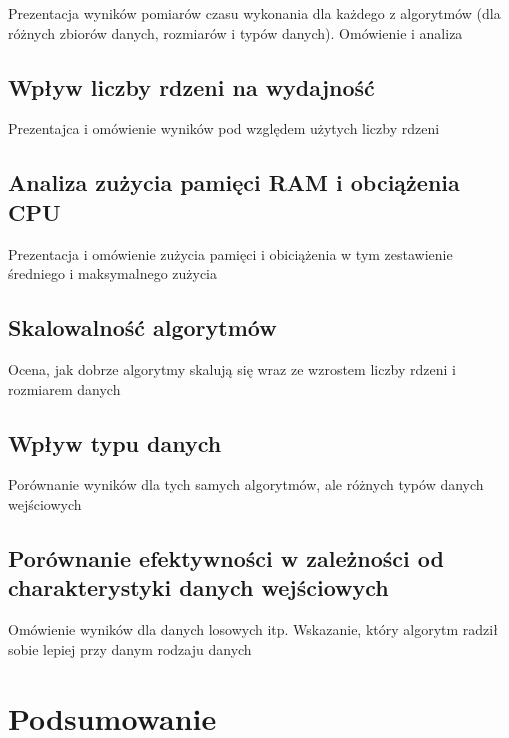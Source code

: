 \documentclass{PracaDyplomowa-Szablon}
\begin{document}
Prezentacja wyników pomiarów czasu wykonania dla każdego z algorytmów (dla różnych zbiorów danych, rozmiarów i typów danych). Omówienie i analiza

\section{Wpływ liczby rdzeni na wydajność}
\label{sec:LiczbaRdzeni}

Prezentajca i omówienie wyników pod względem użytych liczby rdzeni

\section{Analiza zużycia pamięci RAM i obciążenia CPU}
\label{sec:RamCpu}

Prezentacja i omówienie zużycia pamięci i obiciążenia w tym zestawienie średniego i maksymalnego zużycia 

\section{Skalowalność algorytmów}
\label{sec:SkalowalnoscAlgorytmow}

Ocena, jak dobrze algorytmy skalują się wraz ze wzrostem liczby rdzeni i rozmiarem danych

\section{Wpływ typu danych}
\label{sec:IntFloat}

Porównanie wyników dla tych samych algorytmów, ale różnych typów danych wejściowych

\section{Porównanie efektywności w zależności od charakterystyki danych wejściowych}
\label{sec:EfektywnoscDaneWejsciowe}

Omówienie wyników dla danych losowych itp. Wskazanie, który algorytm radził sobie lepiej przy danym rodzaju danych



\cleardoublepage
\chapter*{Podsumowanie}
\end{document}
